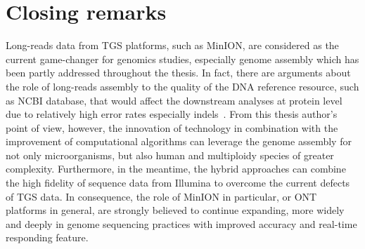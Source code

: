 \section{Closing remarks}
Long-reads data from TGS platforms, such as MinION, are considered as the  current game-changer for genomics studies, especially genome assembly which has been partly addressed throughout the thesis.
In fact, there are arguments about the role of long-reads assembly to the quality of the DNA reference resource, such as NCBI database, that would affect the downstream analyses at protein level due to relatively high error rates especially indels~\cite{Watson2019errors,Koren2019reply}.
From this thesis author's point of view, however, the innovation of technology in combination with the improvement of computational algorithms can leverage the genome assembly for not only microorganisms, but also human and multiploidy species of greater complexity.
Furthermore, in the meantime, the hybrid approaches can combine the high fidelity of sequence data from Illumina to overcome the current defects of TGS data.
In consequence, the role of MinION in particular, or ONT platforms in general, are strongly believed to continue expanding, more widely and deeply in genome sequencing practices with improved accuracy and real-time responding feature.
